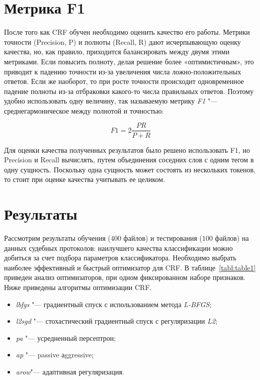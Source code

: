 \documentclass{csmathnotes}
\begin{document}
\section*{Метрика F1}
После того как CRF обучен необходимо оценить качество его работы. Метрики точности (Precision, P) и полноты (Recall, R) дают исчерпывающую оценку качества, но, как правило, приходится балансировать между двумя этими метриками.
Если повысить полноту, делая решение более «оптимистичным», это приводит к падению точности из-за увеличения числа ложно-положительных ответов.
Если же наоборот, то при росте точности происходит одновременное падение полноты из-за отбраковки какого-то числа правильных ответов.
Поэтому удобно использовать одну величину, так называемую метрику \emph{F1} "--- среднегармоническое между полнотой и точностью:

\begin{equation}
F1 = 2\frac{P R}{P + R} 
\end{equation}

Для оценки качества полученных результатов было решено использовать F1, но Precision и Recall вычислять, путем объединения соседних слов с одним тегом в одну сущность.
Поскольку одна сущность может состоять из нескольких токенов, то стоит при оценке качества учитывать ее целиком. 

\section*{Результаты}
Рассмотрим результаты обучения ($400$ файлов) и тестирования ($100$ файлов) на данных судебных протоколов: наилучшего качества классификации можно добиться за счет подбора параметров классификатора. Необходимо выбрать наиболее эффективный и быстрый оптимизатор для CRF. В таблице~\ref{tabl:table1} приведен анализ оптимизаторов, при одном фиксированном наборе признаков. Ниже приведены алгоритмы оптимизации CRF.

\begin{itemize}
    \item \emph{lbfgs} "--- градиентный спуск с использованием метода 
    \emph{L-BFGS};
    \item \emph{l2sgd} "--- стохастический  градиентный спуск с регуляризации \emph{L2};
    \item \emph{pa} "--- усредненный персептрон;
    \item \emph{ap} "--- passive аggressive;
    \item \emph{arow}"--- адаптивная регуляризация.
\end{itemize}
\end{document}
